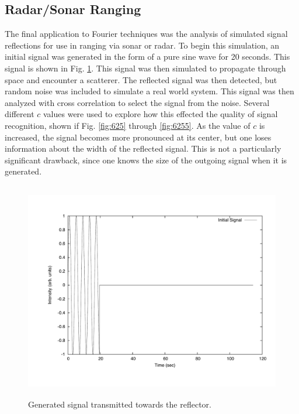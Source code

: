 \documentclass[12pt]{article}
\begin{document}
\subsection{Radar/Sonar Ranging}
The final application to Fourier techniques was the analysis of simulated signal reflections for use in ranging via sonar or radar.  To begin this simulation, an initial signal was generated in the form of a pure sine wave for 20 seconds.  This signal is shown in Fig. \ref{fig:625init}.  This signal was then simulated to propagate through space and encounter a scatterer.  The reflected signal was then detected, but random noise was included to simulate a real world system.  This signal was then analyzed with cross correlation to select the signal from the noise.  Several different $c$ values were used to explore how this effected the quality of signal recognition, shown if Fig. \ref{fig:625} through \ref{fig:6255}.  As the value of $c$ is increased, the signal becomes more pronounced at its center, but one loses information about the width of the reflected signal.  This is not a particularly significant drawback, since one knows the size of the outgoing signal when it is generated.
\begin{figure}[!h]
\centering
\includegraphics[width =120 mm, height = 95mm]{Ex_6_25_init.pdf}
\caption{Generated signal transmitted towards the reflector.}
\label{fig:625init}
\end{figure}
\end{document}

